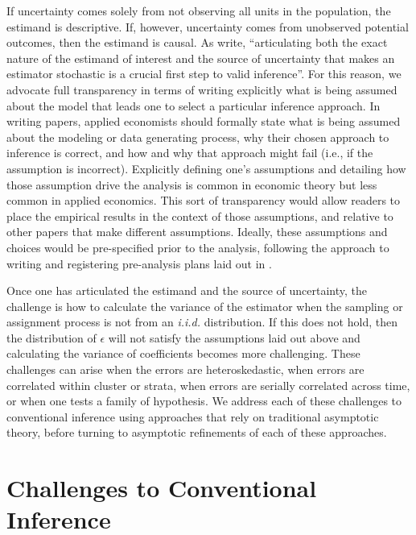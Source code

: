 \documentclass[11pt]{article}
\begin{document}
If uncertainty comes solely from not observing all units in the population, the estimand is descriptive. If, however, uncertainty comes from unobserved potential outcomes, then the estimand is causal. As \cite{abadie_samplingbased_2020} write, ``articulating both the exact nature of the estimand of interest and the source of uncertainty that makes an estimator stochastic is a crucial first step to valid inference''. For this reason, we advocate full transparency in terms of writing explicitly what is being assumed about the model that leads one to select a particular inference approach. In writing papers, applied economists should formally state what is being assumed about the modeling or data generating process, why their chosen approach to inference is correct, and how and why that approach might fail (i.e., if the assumption is incorrect). Explicitly defining one’s assumptions and detailing how those assumption drive the analysis is common in economic theory but less common in applied economics. This sort of transparency would allow readers to place the empirical results in the context of those assumptions, and relative to other papers that make different assumptions. Ideally, these assumptions and choices would be pre-specified prior to the analysis, following the approach to writing and registering pre-analysis plans laid out in \cite{janzen_ulysses_2021}.

Once one has articulated the estimand and the source of uncertainty, the challenge is how to calculate the variance of the estimator when the sampling or assignment process is not from an \emph{i.i.d.} distribution. If this does not hold, then the distribution of $\epsilon$ will not satisfy the assumptions laid out above and calculating the variance of coefficients becomes more challenging. These challenges can arise when the errors are heteroskedastic, when errors are correlated within cluster or strata, when errors are serially correlated across time, or when one tests a family of hypothesis. We address each of these challenges to conventional inference using approaches that rely on traditional asymptotic theory, before turning to asymptotic refinements of each of these approaches.


\section{Challenges to Conventional Inference}
\end{document}
